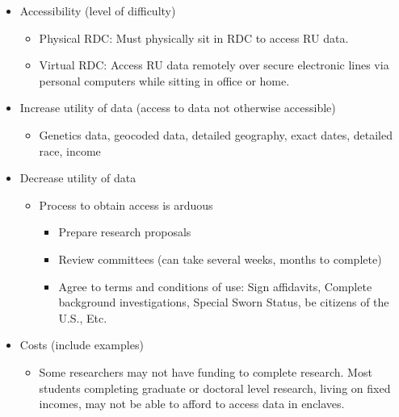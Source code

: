 \begin{itemize}
    \item Accessibility (level of difficulty)
    \begin{itemize}
         \item Physical RDC: Must physically sit in RDC to access RU data.
        \item Virtual RDC: Access RU data remotely over secure electronic lines via personal computers while sitting in office or home.
    \end{itemize}
    \item Increase utility of data (access to data not otherwise accessible) 
    \begin{itemize}
         \item Genetics data, geocoded data, detailed geography, exact dates, detailed race, income
    \end{itemize}
    \item Decrease utility of data
    \begin{itemize}
        \item        Process to obtain access is arduous
        \begin{itemize}
             \item Prepare research proposals
            \item Review committees (can take several weeks, months to complete)
            \item Agree to terms and conditions of use: 
           Sign affidavits, 
           Complete background investigations, Special Sworn Status, be citizens of the U.S.,  
           Etc.
        \end{itemize}
    \end{itemize}
    \item Costs (include examples)
    \begin{itemize}
        \item        Some researchers may not have funding to complete research. Most students completing graduate or doctoral level research, living on fixed incomes, may not be able to afford to access data in enclaves.
    \end{itemize}

\end{itemize}



